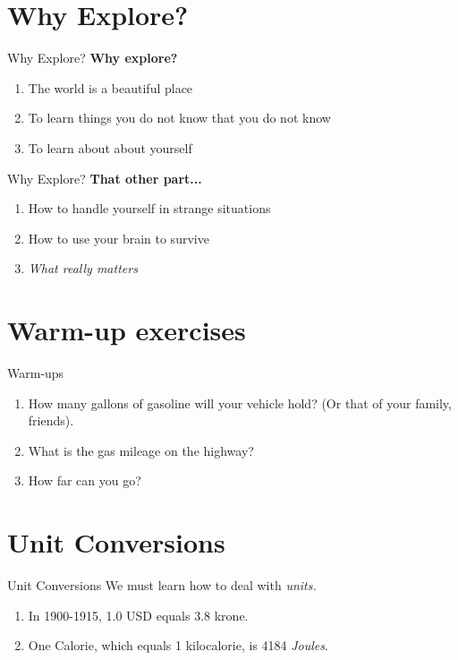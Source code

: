 \documentclass{beamer}
\begin{document}
\section{Why Explore?}

\begin{frame}{Why Explore?}
\textbf{Why explore?}
\begin{enumerate}
\item The world is a beautiful place
\item To learn things you do not know that you do not know
\item To learn about about yourself
\end{enumerate}
\end{frame}

\begin{frame}{Why Explore?}
\textbf{That other part...}
\begin{enumerate}
\item How to handle yourself in strange situations
\item How to use your brain to survive
\item \textit{What really matters}
\end{enumerate}
\end{frame}

\section{Warm-up exercises}

\begin{frame}{Warm-ups}
\begin{enumerate}
\item How many gallons of gasoline will your vehicle hold?  (Or that of your family, friends).
\item What is the gas mileage on the highway?
\item How far can you go?
\end{enumerate}
\end{frame}

\section{Unit Conversions}

\begin{frame}{Unit Conversions}
We must learn how to deal with \textit{units.}
\begin{enumerate}
\item In 1900-1915, 1.0 USD equals 3.8 krone.
\item One Calorie, which equals 1 kilocalorie, is 4184 \textit{Joules}.
\end{enumerate}
\end{frame}
\end{document}

